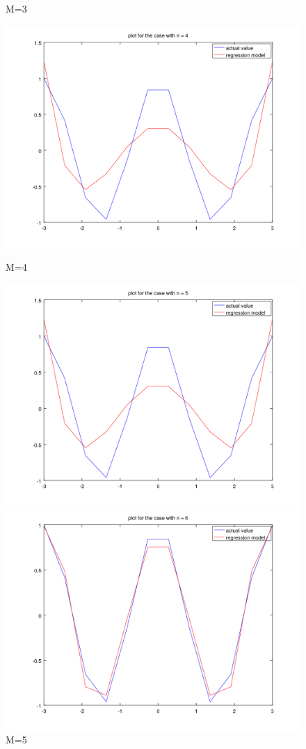 \documentclass[11pt]{article}
\theoremstyle{plain}
\theoremstyle{definition}
\begin{document}
\begin{figure}[!htb]
\begin{minipage}{0.48\textwidth}
     \caption{M=3}\label{Fig:M=3}
   \end{minipage}\hfill
   \begin {minipage}{0.48\textwidth}
     \centering
     \includegraphics[width=.7\linewidth]{hw1_task6_fig4.png}
     \caption{M=4}\label{Fig:M=4}
   \end{minipage}\hfill
   \begin{minipage}{0.48\textwidth}
     \centering
     \includegraphics[width=.7\linewidth]{hw1_task6_fig5.png}
     \caption{M=5}\label{Fig:M=5}
   \end{minipage}\hfill
   \begin {minipage}{0.48\textwidth}
     \centering
     \includegraphics[width=.7\linewidth]{hw1_task6_fig6.png}

\end{minipage}
\end{figure}
\end{document}
